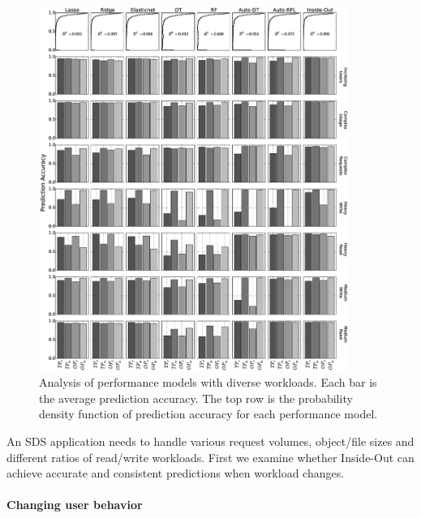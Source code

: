 \begin{figure}
    \centering
    \includegraphics[width=0.9\textwidth]{Chapter-InsideOut/figures/unseen_workload_all_new.eps}
    \caption{Analysis of performance models with diverse workloads. Each bar is the average prediction accuracy. The top row is the probability density function of prediction accuracy for each performance model.}
    \label{fig:changing_workload}
\end{figure}


An SDS application needs to handle various request volumes, object/file sizes and different ratios of read/write workloads.
First we examine whether Inside-Out can achieve accurate and consistent predictions when workload changes.


\paragraph*{Changing user behavior}

